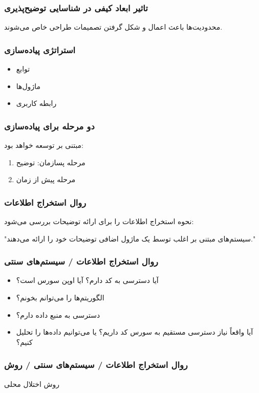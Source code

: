 \documentclass[10pt, a4paper]{beamer}
\begin{document}
\begin{frame}
    \frametitle{تاثیر ابعاد کیفی در شناسایی توضیح‌پذیری}

    \centering
    محدودیت‌ها باعث اعمال و شکل گرفتن تصمیمات طراحی خاص می‌شوند.
\end{frame}

\begin{frame}
    \frametitle{استراتژی پیاده‌سازی}

    \begin{itemize}
        \item توابع
        \item ماژول‌ها
        \item رابطه کاربری
    \end{itemize}
\end{frame}

\begin{frame}
    \frametitle{دو مرحله برای پیاده‌سازی}
    مبتنی بر توسعه خواهد بود:

    \begin{enumerate}
        \item مرحله پسازمان: توضیح 
        \item مرحله پیش از زمان
    \end{enumerate}
\end{frame}

\begin{frame}
    \frametitle{روال استخراج اطلاعات}
    نحوه استخراج اطلاعات را برای ارائه توضیحات بررسی می‌شود:

    \centering
    "سیستم‌های مبتنی بر  اغلب توسط یک ماژول اضافی توضیحات خود را ارائه
    می‌دهند."
\end{frame}

\begin{frame}
    \frametitle{روال استخراج اطلاعات / سیستم‌های سنتی}

    \begin{itemize}
        \item آیا دسترسی به کد دارم؟ آیا اوپن سورس است؟
        \item الگوریتم‌ها را می‌توانم بخونم؟
        \item دسترسی به منبع داده دارم؟
        \item آیا واقعاً نیاز دسترسی مستقیم به سورس کد داریم؟ یا می‌توانیم
        داده‌ها را تحلیل کنیم؟
    \end{itemize}
\end{frame}

\begin{frame}
    \frametitle{روال استخراج اطلاعات / سیستم‌های سنتی / روش}

    \centering
    روش اختلال محلی
\end{frame}
\end{document}
